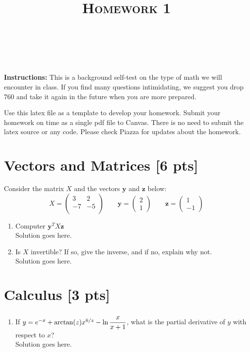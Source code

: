 \documentclass[a4paper]{article}
\title{\textsc{Homework 1}} %
\author{
	\red{$>>$NAME HERE$<<$} \\
	\red{$>>$ID HERE$<<$}\\
}
\date{}
\theoremstyle{definition}
\newenvironment{soln}{
	\leavevmode\color{blue}\ignorespaces
}{}
\begin{document}
	
	\maketitle 
	
	
	\textbf{Instructions:} 
	This is a background self-test on the type of math we will encounter in class. If you find many questions intimidating, we suggest you drop 760 and take it again in the future when you are more prepared.
	
	Use this latex file as a template to develop your homework.
	Submit your homework on time as a single pdf file to Canvas.
	There is no need to submit the latex source or any code.
	Please check Piazza for updates about the homework.
	
	
	\section{Vectors and Matrices [6 pts]}
	Consider the matrix $X$ and the vectors $\mathbf{y}$ and $\textbf{z}$ below:
	$$
	X = \begin{pmatrix}
		3 & 2 \\ -7 & -5 \\
	\end{pmatrix}
	\qquad \mathbf{y} = \begin{pmatrix}
		2 \\ 1
	\end{pmatrix} \qquad \mathbf{z} = \begin{pmatrix}
		1 \\ -1
	\end{pmatrix}
	$$
	\begin{enumerate}
		\item 	Computer $\mathbf{y}^{T} X \mathbf{z}$\\
			    \begin{soln} Solution goes here. \end{soln}
		\item 	Is $X$ invertible? If so, give the inverse, and if no, explain why not.\\
		        \begin{soln}  Solution goes here. \end{soln}
	\end{enumerate}
	
	
	\section{Calculus [3 pts]}
	\begin{enumerate}
		\item If $y = e^{-x} + \arctan(z)x^{6/z} - \ln\cfrac{x}{x+1}$, what is the partial derivative of $y$ with respect to $x$?\\
		\begin{soln}  Solution goes here. \end{soln}
	\end{enumerate}
	
\end{document}
